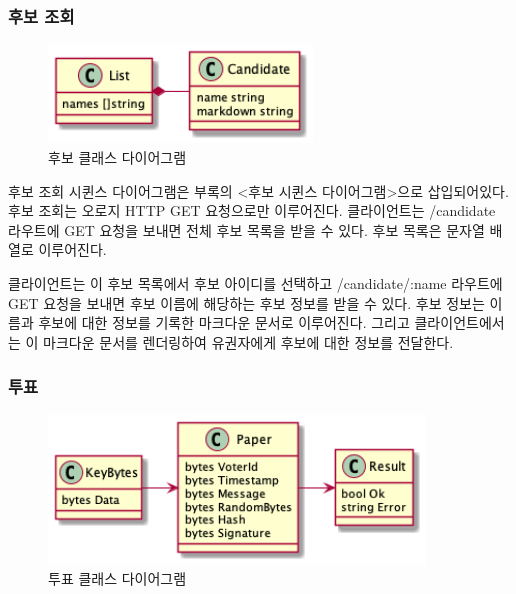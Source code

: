 \documentclass[8pt,a4paper,left=8mm,right=8mm,top=10mm,bottom=10mm]{article}
\begin{document}
    \subsubsection{후보 조회}

    \begin{figure}[h]
        \begin{center}
            \includegraphics[width=7cm]{candidate-class}
            \caption{후보 클래스 다이어그램}
        \end{center}
    \end{figure}

    후보 조회 시퀸스 다이어그램은 부록의 <후보 시퀸스 다이어그램>으로 삽입되어있다. 후보 조회는 오로지 HTTP GET 요청으로만 이루어진다. 클라이언트는 /candidate 라우트에 GET 요청을 보내면 전체 후보 목록을 받을 수 있다. 후보 목록은 문자열 배열로 이루어진다.

    클라이언트는 이 후보 목록에서 후보 아이디를 선택하고 /candidate/:name 라우트에 GET 요청을 보내면 후보 이름에 해당하는 후보 정보를 받을 수 있다. 후보 정보는 이름과 후보에 대한 정보를 기록한 마크다운 문서로 이루어진다. 그리고 클라이언트에서는 이 마크다운 문서를 렌더링하여 유권자에게 후보에 대한 정보를 전달한다. 

    \subsubsection{투표}

    \begin{figure}[h]
        \begin{center}
            \includegraphics[width=10cm]{vote-class}
            \caption{투표 클래스 다이어그램}
        \end{center}
    \end{figure}
\end{document}
